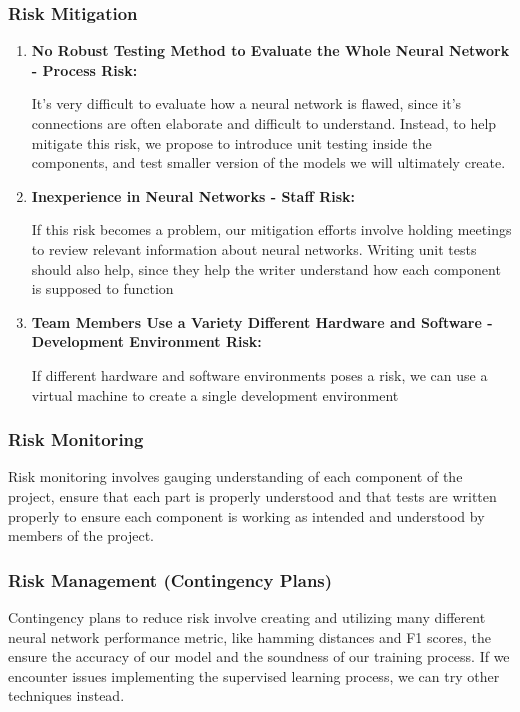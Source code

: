 \documentclass[english,12pt]{article}
\begin{document}
\subsubsection{Risk Mitigation}
\begin{enumerate}[1.]
  \item \textbf{No Robust Testing Method to Evaluate the Whole Neural Network - Process Risk:}

  It's very difficult to evaluate how a neural network is flawed, since it's connections
  are often elaborate and difficult to understand. Instead, to help mitigate this risk,
  we propose to introduce unit testing inside the components, and test smaller version
  of the models we will ultimately create.

  \item \textbf{Inexperience in Neural Networks - Staff Risk:}

  If this risk becomes a problem, our mitigation efforts involve
  holding meetings to review relevant information about neural networks. 
  Writing unit tests should also help, since they help the writer understand
  how each component is supposed to function

  \item \textbf{Team Members Use a Variety Different Hardware and Software 
  - Development Environment Risk:}
  
 If different hardware and software environments poses a risk, we can use a virtual machine
 to create a single development environment
\end{enumerate}
\subsubsection{Risk Monitoring}
Risk monitoring involves gauging understanding of each component of the project, ensure
that each part is properly understood and that tests are written properly to ensure each component
is working as intended and understood by members of the project.

\subsubsection{Risk Management (Contingency Plans)}
Contingency plans to reduce risk involve creating and utilizing many different
neural network performance metric, like hamming distances and F1 scores, the ensure
the accuracy of our model and the soundness of our training process. If we encounter
issues implementing the supervised learning process, we can try other techniques instead.
\end{document}
